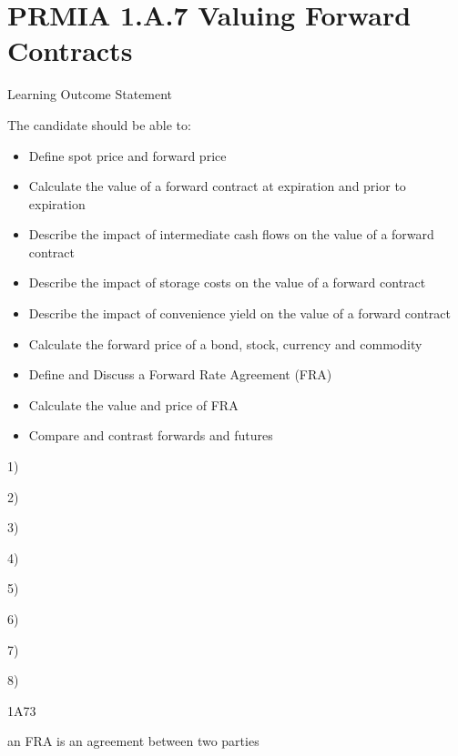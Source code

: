 \section{PRMIA 1.A.7 Valuing Forward Contracts}



Learning Outcome Statement


The candidate should be able to:
\begin{itemize}
\item  Define spot price and forward price

\item  Calculate the value of a forward contract at expiration and prior to expiration

\item  Describe the impact of intermediate cash flows on the value of a forward contract

\item  Describe the impact of storage costs on the value of a forward contract

\item  Describe the impact of convenience yield on the value of a forward contract

\item  Calculate the forward price of a bond, stock, currency and commodity

\item  Define and Discuss a Forward Rate Agreement (FRA)

\item  Calculate the value and price of FRA

\item  Compare and contrast forwards and futures
\end{itemize}



1)

2)

3)

4)

5) 

6)

7) 

8) 



1A73

an FRA is an agreement between two parties

